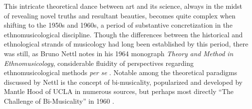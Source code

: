 This intricate theoretical dance between art and its science, always in
the midst of revealing novel truths and resultant beauties, becomes
quite complex when shifting to the 1950s and 1960s, a period of
substantive concretization in the ethnomusicological discipline. Though
the differences between the historical and ethnological strands of
musicology had long been established by this period, there was still, as
Bruno Nettl notes in his 1964 monograph \emph{Theory and Method in
Ethnomusicology}, considerable fluidity of perspectives regarding
ethnomusicological methods \emph{per se}
\autocite*[12]{nettl_what_1964}. Notable among the theoretical paradigms
discussed by Nettl is the concept of bi-musicality, popularized and
developed by Mantle Hood of UCLA in numerous sources, but perhaps most
directly ``The Challenge of Bi-Musicality'' in 1960
\autocite*[22]{nettl_what_1964}.

